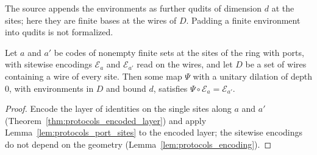 \begin{remark}
    The source appends the environments as further qudits of dimension $d$ at the sites; here
    they are finite bases at the wires of $D$. Padding a finite environment into qudits is not
    formalized.
\end{remark}

\begin{lemma}
    \label{lem:protocols_port_recode}
    \leanok
    Let $a$ and $a'$ be codes of nonempty finite sets at the sites of the ring with ports, with
    sitewise encodings $\mathcal E_a$ and $\mathcal E_{a'}$ read on the wires, and let $D$ be a
    set of wires containing a wire of every site. Then some map $\Psi$ with a unitary dilation
    of depth $0$, with environments in $D$ and bound $d$, satisfies
    $\Psi\circ\mathcal E_a=\mathcal E_{a'}$.
\end{lemma}
\begin{proof}\leanok
    Encode the layer of identities on the single sites along $a$ and $a'$
    (Theorem~\ref{thm:protocols_encoded_layer}) and apply Lemma~\ref{lem:protocols_port_sites}
    to the encoded layer; the sitewise encodings do not depend on the geometry
    (Lemma~\ref{lem:protocols_encoding}).
\end{proof}

